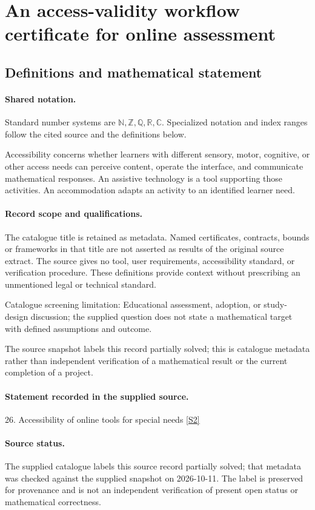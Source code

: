 \documentclass[11pt]{article}
\newcommand{\sref}[2]{\hyperlink{source:#1:#2}{[S#2]}}
\begin{document}
\section{An access-validity workflow certificate for online assessment}\label{statement}

\subsection{Definitions and mathematical statement}

\paragraph{Shared notation.}Standard number systems are $\mathbb N,\mathbb Z,\mathbb Q,\mathbb R,\mathbb C$. Specialized notation and index ranges follow the cited source and the definitions below.


Accessibility concerns whether learners with different sensory, motor, cognitive, or other access needs can perceive content, operate the interface, and communicate mathematical responses. An assistive technology is a tool supporting those activities. An accommodation adapts an activity to an identified learner need.
\paragraph{Record scope and qualifications.}
The catalogue title is retained as metadata. Named certificates, contracts, bounds or frameworks in that title are not asserted as results of the original source extract.
The source gives no tool, user requirements, accessibility standard, or verification procedure. These definitions provide context without prescribing an unmentioned legal or technical standard.

Catalogue screening limitation: Educational assessment, adoption, or study-design discussion; the supplied question does not state a mathematical target with defined assumptions and outcome.

The source snapshot labels this record partially solved; this is catalogue metadata rather than independent verification of a mathematical result or the current completion of a project.
\paragraph{Statement recorded in the supplied source.}
26. Accessibility of online tools for special needs \sref{statement}{2}
\paragraph{Source status.}
The supplied catalogue labels this source record partially solved; that metadata was checked against the supplied snapshot on 2026-10-11. The label is preserved for provenance and is not an independent verification of present open status or mathematical correctness.
\end{document}
